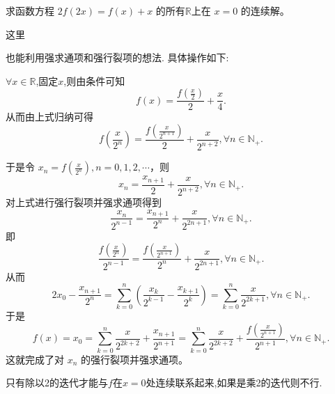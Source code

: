 \documentclass[../../main.tex]{subfiles}
\begin{document}
\begin{example}
求函数方程 \(2f(2x)=f(x)+x\) 的所有\(\mathbb{R}\)上在 \(x = 0\) 的连续解。
\end{example}
\begin{note}
\hypertarget{注意到的原因见笔记部分123}{这里}也能利用强求通项和强行裂项的想法. 具体操作如下:

$\forall x\in \mathbb{R}$,固定$x$,则由条件可知
\[
f(x)=\frac{f\left(\frac{x}{2}\right)}{2}+\frac{x}{4}.
\]
从而由上式归纳可得
\[
f\left(\frac{x}{2^n}\right)=\frac{f\left(\frac{x}{2^{n + 1}}\right)}{2}+\frac{x}{2^{n + 2}},\forall n\in \mathbb{N}_+.
\]

于是令 \(x_n = f\left(\frac{x}{2^n}\right),n = 0,1,2,\cdots\)，则
\[
x_n=\frac{x_{n + 1}}{2}+\frac{x}{2^{n + 2}},\forall n\in \mathbb{N}_+.
\]
对上式进行强行裂项并强求通项得到
\[
\frac{x_n}{2^{n - 1}}=\frac{x_{n + 1}}{2^n}+\frac{x}{2^{2n + 1}},\forall n\in \mathbb{N}_+.
\]
即
\[
\frac{f\left(\frac{x}{2^n}\right)}{2^{n - 1}}=\frac{f\left(\frac{x}{2^{n + 1}}\right)}{2^n}+\frac{x}{2^{2n + 1}},\forall n\in \mathbb{N}_+.
\]
从而
\[
2x_0-\frac{x_{n + 1}}{2^n}=\sum_{k = 0}^n\left(\frac{x_k}{2^{k - 1}}-\frac{x_{k + 1}}{2^k}\right)=\sum_{k = 0}^n\frac{x}{2^{2k + 1}},\forall n\in \mathbb{N}_+.
\]
于是
\[
f(x)=x_0=\sum_{k = 0}^n\frac{x}{2^{2k + 2}}+\frac{x_{n + 1}}{2^{n + 1}}=\sum_{k = 0}^n\frac{x}{2^{2k + 2}}+\frac{f\left(\frac{x}{2^{n + 1}}\right)}{2^{n + 1}},\forall n\in \mathbb{N}_+.
\]
这就完成了对 \(x_n\) 的强行裂项并强求通项。
\end{note}
\begin{remark}
只有除以2的迭代才能与$f$在$x=0$处连续联系起来,如果是乘2的迭代则不行.
\end{remark}
\end{document}
